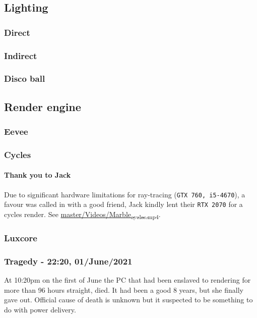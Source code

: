 \documentclass[11pt]{article}
\begin{document}
\subsection{Lighting}
\label{sec:org8239430}
\subsubsection{Direct}
\label{sec:orgc78f4dc}
\subsubsection{Indirect}
\label{sec:org72369f6}
\subsubsection{Disco ball}
\label{sec:org252d4e4}
\subsection{Render engine}
\label{sec:org14ed02d}
\subsubsection{Eevee}
\label{sec:orge4d44bb}
\subsubsection{Cycles}
\label{sec:org5c66aeb}
\paragraph{Thank you to Jack}
\label{sec:org13ece8a}
Due to significant hardware limitations for ray-tracing (\texttt{GTX 760, i5-4670}), a
favour was called in with a good friend, Jack kindly lent their \texttt{RTX 2070}  for a
cycles render. See \href{https://github.com/Jake-Moss/blender-chess/blob/master/Videos/Marble\_cycles.mp4}{master/Videos/Marble\textsubscript{cycles.mp4}}.
\subsubsection{Luxcore}
\label{sec:orgcd378e0}
\subsubsection{Tragedy - 22:20, 01/June/2021}
\label{sec:org1f703bb}
At 10:20pm on the first of June the PC that had been enslaved to rendering for
more than 96 hours straight, died. It had been a good 8 years, but she finally
gave out. Official cause of death is unknown but it suspected to be something to
do with power delivery.
\end{document}
